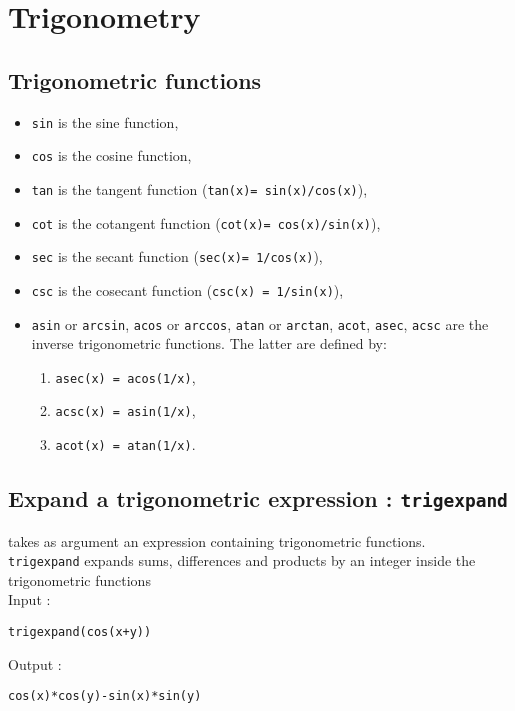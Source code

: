 \documentclass[a4paper,11pt]{book}
\begin{document}
\section{Trigonometry}
\subsection{Trigonometric functions}\label{sec:trigo}
\begin{itemize}
\item {\tt sin}  is the sine function,
\item {\tt cos}   is the cosine function,
\item  {\tt tan}  is the tangent function ({\tt tan(x)=
    sin(x)/cos(x)}),
\item 
{\tt cot}   is the cotangent function ({\tt cot(x)=
  cos(x)/sin(x)}),
\item 
{\tt sec}   is the secant function ({\tt sec(x)=
  1/cos(x)}),
\item
{\tt csc}   is the cosecant function ({\tt csc(x) =
  1/sin(x)}),
\item
{\tt asin} or {\tt arcsin}, {\tt acos} or {\tt arccos}, {\tt atan} or {\tt arctan}, {\tt acot}, {\tt asec}, {\tt acsc}
are the inverse trigonometric functions. The latter are defined by:
\begin{enumerate}
\item {\tt asec(x) = acos(1/x)}, 
\item
{\tt acsc(x) = asin(1/x)},
\item
{\tt  acot(x) = atan(1/x)}. 
\end{enumerate}
\end{itemize}

\subsection{Expand a trigonometric expression : {\tt trigexpand}}
 takes as argument an expression
containing trigonometric functions.\\
{\tt trigexpand} expands sums, differences and products by an integer
inside the trigonometric functions \\
Input :
\begin{center}{\tt trigexpand(cos(x+y))}\end{center}
Output :
\begin{center}{\tt cos(x)*cos(y)-sin(x)*sin(y)}\end{center}
\end{document}
